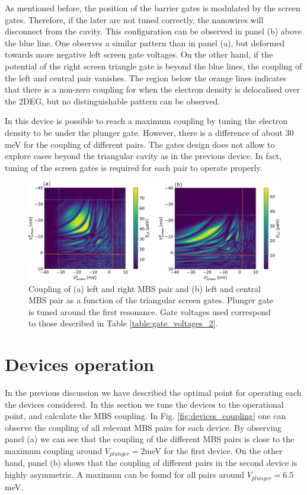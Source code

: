 As mentioned before, the position of the barrier gates is modulated by the screen gates.
Therefore, if the later are not tuned correctly, the nanowires will disconnect from the cavity.
This configuration can be observed in panel (b) above the blue line.
One observes a similar pattern than in panel (a), but deformed towards more negative left screen gate voltages.
On the other hand, if the potential of the right screen triangle gate is beyond the blue lines, the coupling of the left and central pair vanishes.
The region below the orange lines indicates that there is a non-zero coupling for when the electron density is delocalised over the 2DEG, but no distinguishable pattern can be observed.

In this device is possible to reach a maximum coupling by tuning the electron density to be under the plunger gate.
However, there is a difference of about $30$ meV for the coupling of different pairs.
The gates design does not allow to explore cases beyond the triangular cavity as in the previous device.
In fact, tuning of the screen gates is required for each pair to operate properly.

\begin{figure}[h!]
\centering
  \includegraphics[width=\linewidth]{figures/device_2_screens.pdf}
  \caption{Coupling of (a) left and right MBS pair and (b) left and central MBS pair as a function of the triangular screen gates. Plunger gate is tuned around the first resonance. Gate voltages used correspond to those described in Table \ref{table:gate_voltages_2}.}
  \label{fig:device_2_screens}
\end{figure}

\section{Devices operation}

In the previous discussion we have described the optimal point for operating each the devices considered.
In this section we tune the devices to the operational point, and calculate the MBS coupling.
In Fig. \ref{fig:devices_coupling} one can observe the coupling of all relevant MBS pairs for each device.
By observing panel (a) we can see that the coupling of the different MBS pairs is close to the maximum coupling around $V_{plunger}=2$meV for the first device.
On the other hand, panel (b) shows that the coupling of different pairs in the second device is highly asymmetric.
A maximum can be found for all pairs around $V_{plunger} = 6.5$ meV.

